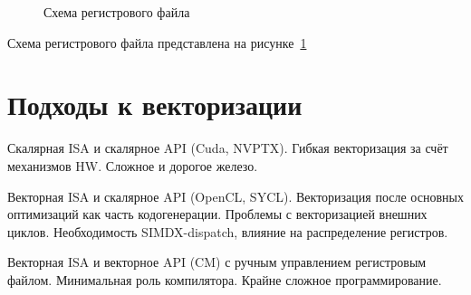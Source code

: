 \begin{figure}[ht]
    \caption{Схема регистрового файла}\label{fig:genisa-addressing-base}
\end{figure}

Схема регистрового файла представлена на рисунке~\cref{fig:genisa-addressing-base}


\section{Подходы к векторизации}\label{sec:overview/vectorizing}

Скалярная ISA и скалярное API (Cuda, NVPTX). Гибкая векторизация за счёт механизмов HW.
Сложное и дорогое железо.

Векторная ISA и скалярное API (OpenCL, SYCL). Векторизация после основных оптимизаций как часть кодогенерации.
Проблемы с векторизацией внешних циклов.
Необходимость SIMDX-dispatch, влияние на распределение регистров.

Векторная ISA и векторное API (CM) с ручным управлением регистровым файлом.
Минимальная роль компилятора.
Крайне сложное программирование.


\FloatBarrier
